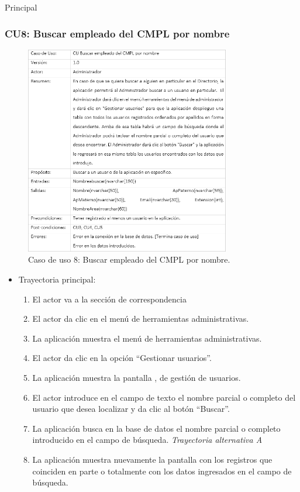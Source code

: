 \begin{UCtrayectoria}{Principal}
\newpage
			
		\subsubsection{CU8: Buscar empleado del CMPL por nombre}
			\begin{figure}[htbp!]
				\centering
					\includegraphics[width=0.8\textwidth]{images/CU/CU8}
					\caption{Caso de uso 8: Buscar empleado del CMPL por nombre.}
				\label{Tabla}
			\end{figure}
			
			\begin{itemize}
				\item Trayectoria principal:
					\begin{enumerate}
						\item El actor va a la sección de correspondencia 
						\item El actor da clic en el menú de herramientas administrativas.
						\item La aplicación muestra el menú de herramientas administrativas.
						\item El actor da clic en la opción ``Gestionar usuarios''.
						\item La aplicación muestra la pantalla , de gestión de usuarios.
						\item El actor introduce en el campo de texto el nombre parcial o completo del usuario que desea localizar y da clic al botón ``Buscar''. 
						\item La aplicación busca en la base de datos el nombre parcial o completo introducido en el campo de búsqueda. \textsl{Trayectoria alternativa A}
						\item La aplicación muestra nuevamente la pantalla  con los registros que coinciden en parte o totalmente con los datos ingresados en el campo de búsqueda.


\end{enumerate}
\end{itemize}
\end{UCtrayectoria}
